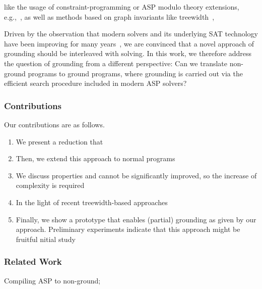 \documentclass{article}
\begin{document}
like the usage of constraint-programming or ASP modulo theory extensions, e.g.,~\cite{BanbaraEtAl17,
JanhunenEtAl17,
CabalarEtAl20}, as well as methods based on graph invariants like treewidth~\cite{BichlerMorakWoltran20,CalimeriPerriZangari19,BliemEtAl20,Mitchell19},
%
%

Driven by the observation that modern solvers and
its underlying SAT technology have been improving for many years~\cite{},
we are convinced that a novel approach of grounding should be  interleaved with solving. %
%
In this work, we therefore address the question of grounding from a  %
different perspective: Can we translate
non-ground programs to ground programs, where grounding is carried out via the efficient search procedure included in modern ASP solvers?
%

\subsubsection*{Contributions}
Our contributions are as follows.
\begin{enumerate}
	\item We present a reduction that
	\item Then, we extend this approach to normal programs
	\item We discuss properties and cannot be significantly improved, so the increase of complexity is required
	\item In the light of recent treewidth-based approaches
	\item Finally, we show a prototype that enables (partial) grounding as given by our approach. Preliminary experiments indicate that this approach might be fruitful nitial study
\end{enumerate}

\subsubsection*{Related Work}
Compiling ASP to non-ground;
\end{document}
